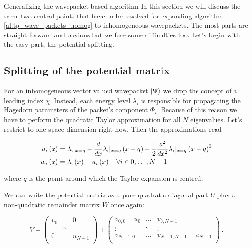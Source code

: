 \begin{chapter}{Generalizing the wavepacket based algorithm}
In this section we will discuss the same two central points that have to be resolved
for expanding algorithm \ref{al:tp_wave_packets_homog} to inhomogeneous
wavepackets. The most parts are straight forward and obvious but we face some
difficulties too. Let's begin with the easy part, the potential splitting.

\subsection{Splitting of the potential matrix}

For an inhomogeneous vector valued wavepacket $\Ket{\Psi}$ we drop the concept of
a leading index $\chi$. Instead, each energy level $\lambda_i$ is responsible for
propagating the Hagedorn parameters of the packet's component $\Phi_i$. Because of
this reason we have to perform the quadratic Taylor approximation for all $N$
eigenvalues. Let's restrict to one space dimension right now. Then the approximations
read

\begin{equation} \label{eq:pot_taylor_split_inhomog}
\begin{split}
  u_i\left( x \right) & = \lambda_i|_{x=q} + \frac{d}{dx}\lambda_i|_{x=q}\left( x-q \right) + \frac{1}{2} \frac{d^2}{dx^2}\lambda_i|_{x=q} \left( x-q \right)^2 \\
  w_i\left( x \right) & = \lambda_i\left( x \right) - u_i\left( x \right) \quad \forall i \in 0, \ldots, N-1
\end{split}
\end{equation}

where $q$ is the point around which the Taylor expansion is centred.

We can write the potential matrix as a pure quadratic diagonal part $U$ plus a
non-quadratic remainder matrix $W$ once again:

\begin{equation} \label{eq:potiential_splitting_inhomog}
  V =
  \begin{pmatrix}
    u_0 & {}     & 0 \\
    {}  & \ddots & {} \\
    0   & {}     & u_{N-1} \\
  \end{pmatrix}
  +
  \begin{pmatrix}
    v_{0,0} - u_0 & \hdots & v_{0,N-1} \\
    \vdots        & \ddots & \vdots \\
    v_{N-1,0}     & \hdots & v_{N-1,N-1} - u_{N-1} \\
  \end{pmatrix} \,.
\end{equation}


\end{chapter}
